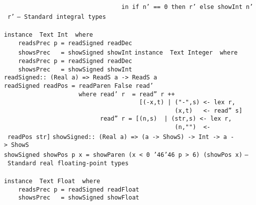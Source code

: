 \mbox{\tt \ \ \ \ \ \ \ \ \ \ \ \ \ \ \ \ \ \ \ \ \ \ \ \ \ \ \ \ \ \ \ \ \ in\ if\ n'\ ==\ 0\ then\ r'\ else\ showInt\ n'\ r'}
%
\eprogB\noindent\bprogB
\mbox{\tt --\ Standard\ integral\ types}\\
\mbox{\tt }\\[-8pt]
\mbox{\tt instance\ \ Text\ Int\ \ where}\\
\mbox{\tt \ \ \ \ readsPrec\ p\ =\ readSigned\ readDec}\\
\mbox{\tt \ \ \ \ showsPrec\ \ \ =\ showSigned\ showInt}
%
\eprogB\noindent\bprogB
\mbox{\tt instance\ \ Text\ Integer\ \ where}\\
\mbox{\tt \ \ \ \ readsPrec\ p\ =\ readSigned\ readDec}\\
\mbox{\tt \ \ \ \ showsPrec\ \ \ =\ showSigned\ showInt}
%
\eprogB\noindent\bprogB
\mbox{\tt readSigned::\ (Real\ a)\ =>\ ReadS\ a\ ->\ ReadS\ a}\\
\mbox{\tt readSigned\ readPos\ =\ readParen\ False\ read'}\\
\mbox{\tt \ \ \ \ \ \ \ \ \ \ \ \ \ \ \ \ \ \ \ \ \ where\ read'\ r\ \ =\ read''\ r\ ++}\\
\mbox{\tt \ \ \ \ \ \ \ \ \ \ \ \ \ \ \ \ \ \ \ \ \ \ \ \ \ \ \ \ \ \ \ \ \ \ \ \ \ \ [(-x,t)\ |\ ("-",s)\ <-\ lex\ r,}\\
\mbox{\tt \ \ \ \ \ \ \ \ \ \ \ \ \ \ \ \ \ \ \ \ \ \ \ \ \ \ \ \ \ \ \ \ \ \ \ \ \ \ \ \ \ \ \ \ \ \ \ \ (x,t)\ \ \ <-\ read''\ s]}\\
\mbox{\tt \ \ \ \ \ \ \ \ \ \ \ \ \ \ \ \ \ \ \ \ \ \ \ \ \ \ \ read''\ r\ =\ [(n,s)\ \ |\ (str,s)\ <-\ lex\ r,}\\
\mbox{\tt \ \ \ \ \ \ \ \ \ \ \ \ \ \ \ \ \ \ \ \ \ \ \ \ \ \ \ \ \ \ \ \ \ \ \ \ \ \ \ \ \ \ \ \ \ \ \ \ (n,"")\ \ <-\ readPos\ str]}
%
\eprogB\noindent\bprogB
\mbox{\tt showSigned::\ (Real\ a)\ =>\ (a\ ->\ ShowS)\ ->\ Int\ ->\ a\ ->\ ShowS}\\
\mbox{\tt showSigned\ showPos\ p\ x\ =\ showParen\ (x\ <\ 0\ {\char'46}{\char'46}\ p\ >\ 6)\ (showPos\ x)}
%
\eprogB\noindent\bprogB
\mbox{\tt --\ Standard\ real\ floating-point\ types}\\
\mbox{\tt }\\[-8pt]
\mbox{\tt instance\ \ Text\ Float\ \ where}\\
\mbox{\tt \ \ \ \ readsPrec\ p\ =\ readSigned\ readFloat}\\
\mbox{\tt \ \ \ \ showsPrec\ \ \ =\ showSigned\ showFloat}
